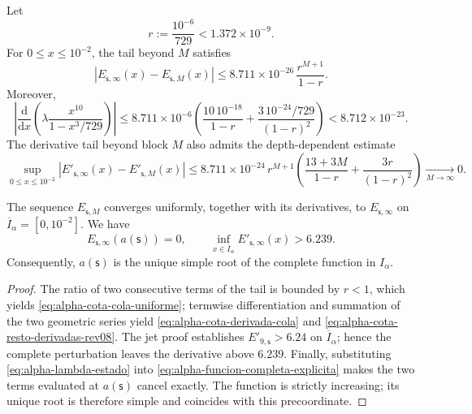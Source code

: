 Let
\[
 r:=\frac{10^{-6}}{729}<1.372\mathbin{\times}10^{-9}.
\]
For \(0\leq x\leq10^{-2}\), the tail beyond \(M\) satisfies
\begin{equation}
 \left|E_{\mathsf s,\infty}(x)-E_{\mathsf s,M}(x)\right|
 \leq
 8.711\mathbin{\times}10^{-26}\,\frac{r^{M+1}}{1-r}.
 \label{eq:alpha-cota-cola-uniforme}
\end{equation}
Moreover,
\begin{equation}
 \left|\frac{\mathrm d}{\mathrm dx}
  \left(\lambda\frac{x^{10}}{1-x^3/729}\right)\right|
 \leq 8.711\mathbin{\times}10^{-6}
 \left(\frac{10\,10^{-18}}{1-r}
 +\frac{3\,10^{-24}/729}{(1-r)^2}\right)
 <8.712\mathbin{\times}10^{-23}.
 \label{eq:alpha-cota-derivada-cola}
\end{equation}
The derivative tail beyond block \(M\) also admits the
depth-dependent estimate
\begin{equation}
 \sup_{0\le x\le10^{-2}}
 \left|E'_{\mathsf s,\infty}(x)-E'_{\mathsf s,M}(x)\right|
 \le 8.711\mathbin{\times}10^{-24}\,r^{M+1}
 \left(\frac{13+3M}{1-r}+\frac{3r}{(1-r)^2}\right)
 \xrightarrow[M\to\infty]{}0.
 \label{eq:alpha-cota-resto-derivadas-rev08}
\end{equation}

\begin{theorem}
\label{thm:alpha-raiz-completa-explicita}
The sequence \(E_{\mathsf s,M}\) converges uniformly, together with its
derivatives, to \(E_{\mathsf s,\infty}\) on
\(\overline I_\alpha=[0,10^{-2}]\). We have
\begin{equation}
 E_{\mathsf s,\infty}(a(\mathsf s))=0,
 \qquad
 \inf_{x\in\overline I_\alpha}
 E'_{\mathsf s,\infty}(x)>6.239.
 \label{eq:alpha-raiz-y-derivada-completas}
\end{equation}
Consequently, \(a(\mathsf s)\) is the unique simple root of the complete
function in \(I_\alpha\).
\end{theorem}

\begin{proof}
The ratio of two consecutive terms of the tail is bounded by \(r<1\),
which yields \eqref{eq:alpha-cota-cola-uniforme}; termwise differentiation
and summation of the two geometric series yield
\eqref{eq:alpha-cota-derivada-cola} and
\eqref{eq:alpha-cota-resto-derivadas-rev08}. The jet proof establishes
\(E'_{9,\mathsf s}>6.24\) on \(\overline I_\alpha\); hence the
complete perturbation leaves the derivative above \(6.239\).
Finally, substituting \eqref{eq:alpha-lambda-estado} into
\eqref{eq:alpha-funcion-completa-explicita} makes the two terms evaluated at
\(a(\mathsf s)\) cancel exactly. The function is strictly
increasing; its unique root is therefore simple and coincides with this precoordinate.
\end{proof}

